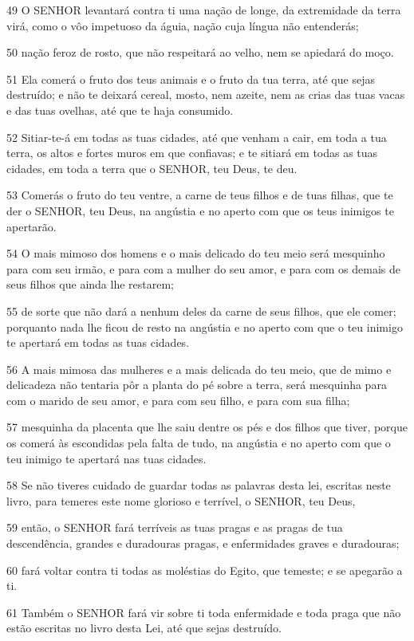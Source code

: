 \par 49 O SENHOR levantará contra ti uma nação de longe, da extremidade da terra virá, como o vôo impetuoso da águia, nação cuja língua não entenderás;
\par 50 nação feroz de rosto, que não respeitará ao velho, nem se apiedará do moço.
\par 51 Ela comerá o fruto dos teus animais e o fruto da tua terra, até que sejas destruído; e não te deixará cereal, mosto, nem azeite, nem as crias das tuas vacas e das tuas ovelhas, até que te haja consumido.
\par 52 Sitiar-te-á em todas as tuas cidades, até que venham a cair, em toda a tua terra, os altos e fortes muros em que confiavas; e te sitiará em todas as tuas cidades, em toda a terra que o SENHOR, teu Deus, te deu.
\par 53 Comerás o fruto do teu ventre, a carne de teus filhos e de tuas filhas, que te der o SENHOR, teu Deus, na angústia e no aperto com que os teus inimigos te apertarão.
\par 54 O mais mimoso dos homens e o mais delicado do teu meio será mesquinho para com seu irmão, e para com a mulher do seu amor, e para com os demais de seus filhos que ainda lhe restarem;
\par 55 de sorte que não dará a nenhum deles da carne de seus filhos, que ele comer; porquanto nada lhe ficou de resto na angústia e no aperto com que o teu inimigo te apertará em todas as tuas cidades.
\par 56 A mais mimosa das mulheres e a mais delicada do teu meio, que de mimo e delicadeza não tentaria pôr a planta do pé sobre a terra, será mesquinha para com o marido de seu amor, e para com seu filho, e para com sua filha;
\par 57 mesquinha da placenta que lhe saiu dentre os pés e dos filhos que tiver, porque os comerá às escondidas pela falta de tudo, na angústia e no aperto com que o teu inimigo te apertará nas tuas cidades.
\par 58 Se não tiveres cuidado de guardar todas as palavras desta lei, escritas neste livro, para temeres este nome glorioso e terrível, o SENHOR, teu Deus,
\par 59 então, o SENHOR fará terríveis as tuas pragas e as pragas de tua descendência, grandes e duradouras pragas, e enfermidades graves e duradouras;
\par 60 fará voltar contra ti todas as moléstias do Egito, que temeste; e se apegarão a ti.
\par 61 Também o SENHOR fará vir sobre ti toda enfermidade e toda praga que não estão escritas no livro desta Lei, até que sejas destruído.

